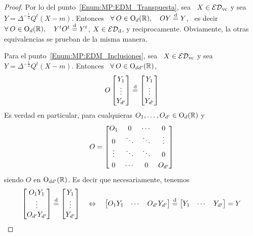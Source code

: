 \begin{proof}
%
  Por lo del punto~\ref{Enum:MP:EDM_Transpuesta}, sea  \ $X \in \mathcal{ED}_{\mathrm{vc}}$ y sea
  \  $Y  =  \Delta^{-\frac12}  Q^t   (X-m)$.   Entonces  \  $\forall  \:  O  \in
  \mathrm{O}_d(\mathbb{R}),  \quad  O   Y  \stackrel{\mathrm{d}}{=}  Y$,  \  es  decir   $\forall  \:  O  \in
  \mathrm{O}_d(\mathbb{R}),  \quad   Y^t  O^t  \stackrel{\mathrm{d}}{=}   Y^t$,  \ie  $X  \in   \mathcal{ED}_{\mathrm{d}}$,  y
  reciprocamente.   Obviamente, la otras  equivalencias se  prueban de  la misma
  manera.

  Para el punto~\ref{Enum:MP:EDM_Inclusiones},  sea \ $X \in \mathcal{ED}_{\mathrm{vc}}$  y sea \
  $Y   =  \Delta^{-\frac12}   Q^t  (X-m)$.   Entonces  \   $\forall  \:   O  \in
  \mathrm{O}_{dd'}(\mathbb{R})$,
  \[
  O \begin{bmatrix}  Y_1\\ \vdots\\ Y_{d'}  \end{bmatrix} \stackrel{\mathrm{d}}{=} \begin{bmatrix}
    Y_1 \\ \vdots \\ Y_{d'} \end{bmatrix}
  \]
  Es  verdad  en  particular,  para   cualquieras  $O_1,  \ldots  ,  O_{d'}  \in
  \mathrm{O}_d(\mathbb{R})$ y
  \[
  O = \begin{bmatrix}  O_1 & 0 & \cdots &  0 \\ 0 & \ddots &  \ddots & \vdots \\
    \vdots  &   \ddots  &  \ddots  &  \vspace{1mm}   0\\  0  &  \cdots   &  0  &
    O_{d'}\end{bmatrix}
  \]
  siendo $O$ en $\mathrm{O}_{dd'}(\mathbb{R})$. Es decir que necesariamente, tenemos
  \[
  \begin{bmatrix}    O_1   Y_1\\    \vdots\\    O_{d'}   Y_{d'}    \end{bmatrix}
  \stackrel{\mathrm{d}}{=}   \begin{bmatrix}  Y_1   \\  \vdots   \\  Y_{d'}   \end{bmatrix}  \quad
  \Leftrightarrow   \quad    \begin{bmatrix}   O_1   Y_1&    \cdots   &   O_{d'}
    Y_{d'}    \end{bmatrix}   \stackrel{\mathrm{d}}{=}    \begin{bmatrix}   Y_1    &    \cdots   &
    Y_{d'} \end{bmatrix} = Y
\]
\end{proof}
